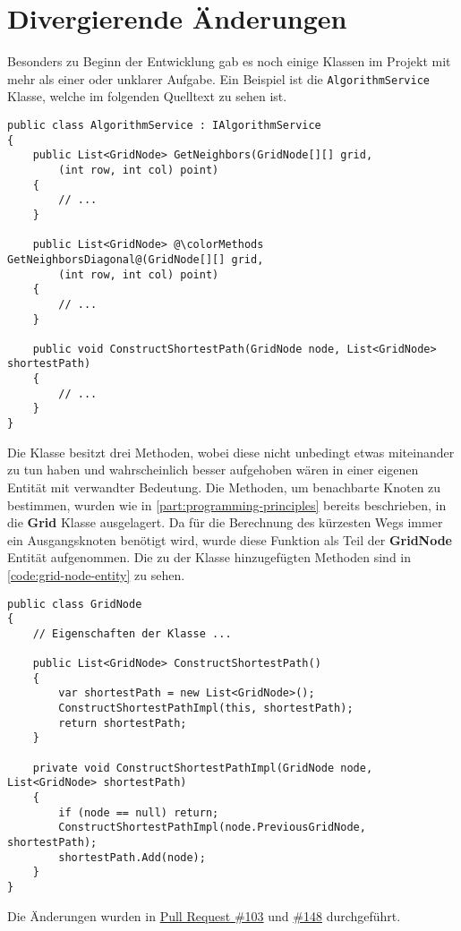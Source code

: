 \section{Divergierende Änderungen}
Besonders zu Beginn der Entwicklung gab es noch einige Klassen
im Projekt mit mehr als einer oder unklarer Aufgabe.
Ein Beispiel ist die \lstinline{AlgorithmService} Klasse,
welche im folgenden Quelltext zu sehen ist.
\begin{lstlisting}[caption={{\lstinline{AlgorithmService}} Klasse},
    label={code:alg-service}]
public class AlgorithmService : IAlgorithmService
{
    public List<GridNode> GetNeighbors(GridNode[][] grid,
        (int row, int col) point)
    {
        // ...
    }

    public List<GridNode> @\colorMethods GetNeighborsDiagonal@(GridNode[][] grid,
        (int row, int col) point)
    {
        // ...
    }

    public void ConstructShortestPath(GridNode node, List<GridNode> shortestPath)
    {
        // ...
    }
}
\end{lstlisting}
Die Klasse besitzt drei Methoden, wobei diese nicht unbedingt etwas miteinander
zu tun haben und wahrscheinlich besser aufgehoben
wären in einer eigenen Entität mit verwandter Bedeutung. Die Methoden,
um benachbarte Knoten zu bestimmen, wurden wie in \autoref{part:programming-principles}
bereits beschrieben, in die \textbf{Grid} Klasse ausgelagert.
Da für die Berechnung des kürzesten Wegs immer ein Ausgangsknoten benötigt wird, wurde diese
Funktion als Teil der \textbf{GridNode} Entität aufgenommen. Die zu der Klasse 
hinzugefügten Methoden sind in \autoref{code:grid-node-entity} zu sehen.
\begin{lstlisting}[caption={\textbf{GridNode} Entität}, label={code:grid-node-entity}]
public class GridNode
{
    // Eigenschaften der Klasse ...

    public List<GridNode> ConstructShortestPath()
    {
        var shortestPath = new List<GridNode>();
        ConstructShortestPathImpl(this, shortestPath);
        return shortestPath;
    }

    private void ConstructShortestPathImpl(GridNode node, List<GridNode> shortestPath)
    {
        if (node == null) return;
        ConstructShortestPathImpl(node.PreviousGridNode, shortestPath);
        shortestPath.Add(node);
    }
}
\end{lstlisting}
Die Änderungen wurden in
\href{https://github.com/JensDll/pathfinding-visualization/pull/103}{Pull Request \#103}
und \href{https://github.com/JensDll/pathfinding-visualization/pull/148}{\#148}
durchgeführt.